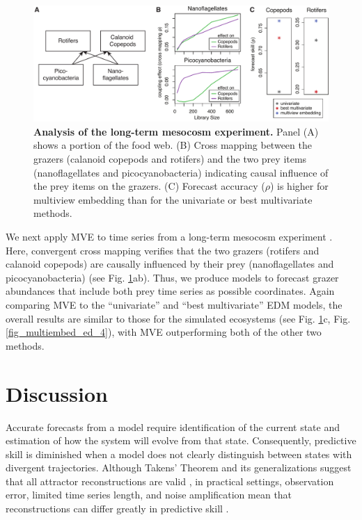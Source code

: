 \begin{figure}[!ht]
\begin{center}\includegraphics[width=\textwidth]{fig_multiembed_4.pdf}\end{center}
\caption[Analysis of the long-term mesocosm experiment.]{\textbf{Analysis of the long-term mesocosm experiment.}\newline
Panel (A) shows a portion of the food web. (B) Cross mapping between the grazers (calanoid copepods and rotifers) and the two prey items (nanoflagellates and picocyanobacteria) indicating causal influence of the prey items on the grazers. (C) Forecast accuracy ($\rho$) is higher for multiview embedding than for the univariate or best multivariate methods.}
\label{fig_multiembed_mesocosm_results}
\end{figure}

We next apply MVE to time series from a long-term mesocosm experiment \cite{Heerkloss_1998, Beninca_2009}. Here, convergent cross mapping \cite{Sugihara_2012} verifies that the two grazers (rotifers and calanoid copepods) are causally influenced by their prey (nanoflagellates and picocyanobacteria) (see Fig. \ref{fig_multiembed_mesocosm_results}ab). Thus, we produce models to forecast grazer abundances that include both prey time series as possible coordinates. Again comparing MVE to the ``univariate'' and ``best multivariate'' EDM models, the overall results are similar to those for the simulated ecosystems (see Fig. \ref{fig_multiembed_mesocosm_results}c, Fig. \ref{fig_multiembed_ed_4}), with MVE outperforming both of the other two methods.

\section{Discussion}
Accurate forecasts from a model require identification of the current state and estimation of how the system will evolve from that state. Consequently, predictive skill is diminished when a model does not clearly distinguish between states with divergent trajectories. Although Takens' Theorem and its generalizations suggest that all attractor reconstructions are valid \cite{Takens_1981, Sauer_1991, Deyle_2011}, in practical settings, observation error, limited time series length, and noise amplification mean that reconstructions can differ greatly in predictive skill \cite{Casdagli_1991}.

